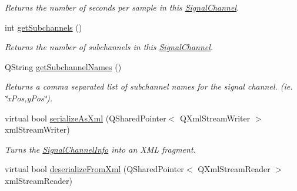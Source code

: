 \begin{DoxyCompactItemize}
\begin{DoxyCompactList}\small\item\em Returns the number of seconds per sample in this \hyperlink{class_picto_1_1_signal_channel}{Signal\-Channel}. \end{DoxyCompactList}\item 
\hypertarget{class_picto_1_1_signal_channel_info_a1d8bc154952d1917607ae1ddea7e60fa}{int \hyperlink{class_picto_1_1_signal_channel_info_a1d8bc154952d1917607ae1ddea7e60fa}{get\-Subchannels} ()}\label{class_picto_1_1_signal_channel_info_a1d8bc154952d1917607ae1ddea7e60fa}

\begin{DoxyCompactList}\small\item\em Returns the number of subchannels in this \hyperlink{class_picto_1_1_signal_channel}{Signal\-Channel}. \end{DoxyCompactList}\item 
\hypertarget{class_picto_1_1_signal_channel_info_a5d116e4450f9dffd0e5f196f89d5c7ba}{Q\-String \hyperlink{class_picto_1_1_signal_channel_info_a5d116e4450f9dffd0e5f196f89d5c7ba}{get\-Subchannel\-Names} ()}\label{class_picto_1_1_signal_channel_info_a5d116e4450f9dffd0e5f196f89d5c7ba}

\begin{DoxyCompactList}\small\item\em Returns a comma separated list of subchannel names for the signal channel. (ie. \char`\"{}x\-Pos,y\-Pos\char`\"{}). \end{DoxyCompactList}\item 
\hypertarget{class_picto_1_1_signal_channel_info_a1a5775330e47eed5423abb9dca76af8b}{virtual bool \hyperlink{class_picto_1_1_signal_channel_info_a1a5775330e47eed5423abb9dca76af8b}{serialize\-As\-Xml} (Q\-Shared\-Pointer$<$ Q\-Xml\-Stream\-Writer $>$ xml\-Stream\-Writer)}\label{class_picto_1_1_signal_channel_info_a1a5775330e47eed5423abb9dca76af8b}

\begin{DoxyCompactList}\small\item\em Turns the \hyperlink{class_picto_1_1_signal_channel_info}{Signal\-Channel\-Info} into an X\-M\-L fragment. \end{DoxyCompactList}\item 
virtual bool \hyperlink{class_picto_1_1_signal_channel_info_a30225d1614c6545bfa1c2bafbca7b7ca}{deserialize\-From\-Xml} (Q\-Shared\-Pointer$<$ Q\-Xml\-Stream\-Reader $>$ xml\-Stream\-Reader)
\end{DoxyCompactItemize}
